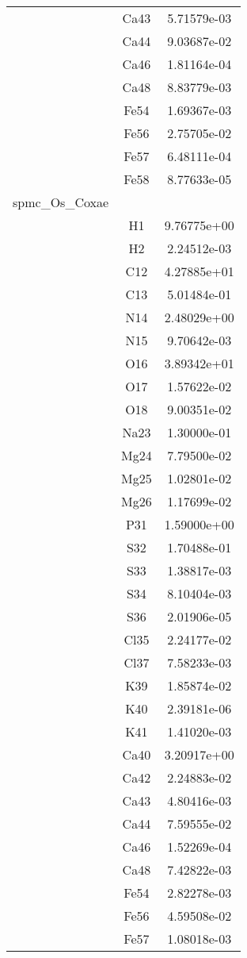 \begin{centering}
\begin{longtable}{l c c}
& Ca43 & 5.71579e-03 \\ 
& Ca44 & 9.03687e-02 \\ 
& Ca46 & 1.81164e-04 \\ 
& Ca48 & 8.83779e-03 \\ 
& Fe54 & 1.69367e-03 \\ 
& Fe56 & 2.75705e-02 \\ 
& Fe57 & 6.48111e-04 \\ 
& Fe58 & 8.77633e-05 \\ 
\hline
spmc_Os_Coxae & & \\
\hline
& H1 & 9.76775e+00 \\ 
& H2 & 2.24512e-03 \\ 
& C12 & 4.27885e+01 \\ 
& C13 & 5.01484e-01 \\ 
& N14 & 2.48029e+00 \\ 
& N15 & 9.70642e-03 \\ 
& O16 & 3.89342e+01 \\ 
& O17 & 1.57622e-02 \\ 
& O18 & 9.00351e-02 \\ 
& Na23 & 1.30000e-01 \\ 
& Mg24 & 7.79500e-02 \\ 
& Mg25 & 1.02801e-02 \\ 
& Mg26 & 1.17699e-02 \\ 
& P31 & 1.59000e+00 \\ 
& S32 & 1.70488e-01 \\ 
& S33 & 1.38817e-03 \\ 
& S34 & 8.10404e-03 \\ 
& S36 & 2.01906e-05 \\ 
& Cl35 & 2.24177e-02 \\ 
& Cl37 & 7.58233e-03 \\ 
& K39 & 1.85874e-02 \\ 
& K40 & 2.39181e-06 \\ 
& K41 & 1.41020e-03 \\ 
& Ca40 & 3.20917e+00 \\ 
& Ca42 & 2.24883e-02 \\ 
& Ca43 & 4.80416e-03 \\ 
& Ca44 & 7.59555e-02 \\ 
& Ca46 & 1.52269e-04 \\ 
& Ca48 & 7.42822e-03 \\ 
& Fe54 & 2.82278e-03 \\ 
& Fe56 & 4.59508e-02 \\ 
& Fe57 & 1.08018e-03 \\ 

\end{longtable}
\end{centering}
